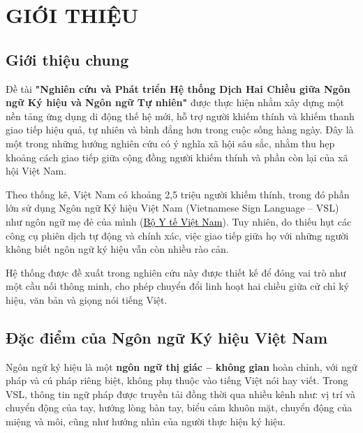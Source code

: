 \chapter{GIỚI THIỆU}
 
\section{Giới thiệu chung}
\setlength{\parindent}{1.25cm} %
\setlength{\parskip}{0.3em}
 

Đề tài \textbf{"Nghiên cứu và Phát triển Hệ thống Dịch Hai Chiều giữa Ngôn ngữ Ký hiệu và Ngôn ngữ Tự nhiên"} được thực hiện nhằm xây dựng một nền tảng ứng dụng di động thế hệ mới, hỗ trợ người khiếm thính và khiếm thanh giao tiếp hiệu quả, tự nhiên và bình đẳng hơn trong cuộc sống hàng ngày. Đây là một trong những hướng nghiên cứu có ý nghĩa xã hội sâu sắc, nhằm thu hẹp khoảng cách giao tiếp giữa cộng đồng người khiếm thính và phần còn lại của xã hội Việt Nam.
 
Theo thống kê, Việt Nam có khoảng 2,5 triệu người khiếm thính, trong đó phần lớn sử dụng Ngôn ngữ Ký hiệu Việt Nam (Vietnamese Sign Language -- VSL) như ngôn ngữ mẹ đẻ của mình
(\href{https://moh.gov.vn/tin-lien-quan/-/asset_publisher/vjYyM7O9aWnX/content/viet-nam-co-khoang-2-5-trieu-nguoi-khuyet-tat-nghe-noi}{\textcolor{black}{Bộ Y tế Việt Nam}}).
Tuy nhiên, do thiếu hụt các công cụ phiên dịch tự động và chính xác, việc giao tiếp giữa họ với những người không biết ngôn ngữ ký hiệu vẫn còn nhiều rào cản.
 
Hệ thống được đề xuất trong nghiên cứu này được thiết kế để đóng vai trò như một cầu nối thông minh, cho phép chuyển đổi linh hoạt hai chiều giữa cử chỉ ký hiệu, văn bản và giọng nói tiếng Việt.
 
\section{Đặc điểm của Ngôn ngữ Ký hiệu Việt Nam}
 
Ngôn ngữ ký hiệu là một \textbf{ngôn ngữ thị giác -- không gian} hoàn chỉnh, với ngữ pháp và cú pháp riêng biệt, không phụ thuộc vào tiếng Việt nói hay viết. Trong VSL, thông tin ngữ pháp được truyền tải đồng thời qua nhiều kênh như: vị trí và chuyển động của tay, hướng lòng bàn tay, biểu cảm khuôn mặt, chuyển động của miệng và môi, cũng như hướng nhìn của người thực hiện ký hiệu.
 
